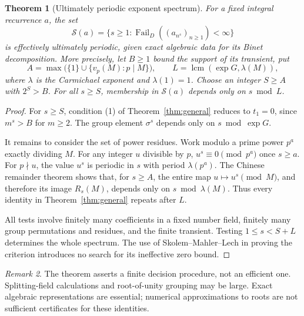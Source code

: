 \documentclass[11pt]{article}
\newtheorem{theorem}{Theorem}
\theoremstyle{definition}
\theoremstyle{remark}
\newtheorem{remark}[theorem]{Remark}
\newcommand{\lcm}{\operatorname{lcm}}
\newcommand{\Fail}{\operatorname{Fail}_{D}}
\begin{document}
\begin{theorem}[Ultimately periodic exponent spectrum]\label{thm:spectrum}
For a fixed integral recurrence $a$, the set
\[
 \mathcal S(a)=\{s\geq1:\Fail((a_{n^s})_{n\geq1})<\infty\}
\]
is effectively ultimately periodic, given exact algebraic data for its Binet decomposition. More precisely, let $B\geq1$ bound the support of its transient, put
\[
 A=\max\bigl(\{1\}\cup\{v_p(M):p\mid M\}\bigr),
 \qquad L=\lcm(\exp G,\lambda(M)),
\]
where $\lambda$ is the Carmichael exponent and $\lambda(1)=1$. Choose an integer $S\geq A$ with $2^S>B$. For all $s\geq S$, membership in $\mathcal S(a)$ depends only on $s\bmod L$.
\end{theorem}
\begin{proof}
For $s\geq S$, condition (1) of Theorem~\ref{thm:general} reduces to $t_1=0$, since $m^s>B$ for $m\geq2$. The group element $\sigma^s$ depends only on $s\bmod\exp G$.

It remains to consider the set of power residues. Work modulo a prime power $p^a$ exactly dividing $M$. For any integer $u$ divisible by $p$, $u^s\equiv0\pmod{p^a}$ once $s\geq a$. For $p\nmid u$, the value $u^s$ is periodic in $s$ with period $\lambda(p^a)$. The Chinese remainder theorem shows that, for $s\geq A$, the entire map $u\mapsto u^s\pmod M$, and therefore its image $R_s(M)$, depends only on $s\bmod\lambda(M)$. Thus every identity in Theorem~\ref{thm:general} repeats after $L$.

All tests involve finitely many coefficients in a fixed number field, finitely many group permutations and residues, and the finite transient. Testing $1\leq s<S+L$ determines the whole spectrum. The use of Skolem--Mahler--Lech in proving the criterion introduces no search for its ineffective zero bound.
\end{proof}

\begin{remark}
The theorem asserts a finite decision procedure, not an efficient one. Splitting-field calculations and root-of-unity grouping may be large. Exact algebraic representations are essential; numerical approximations to roots are not sufficient certificates for these identities.
\end{remark}
\end{document}
